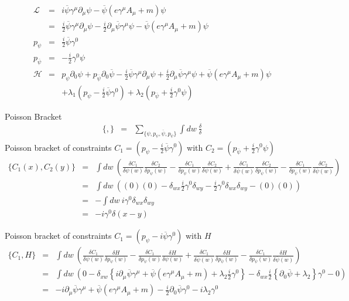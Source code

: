 \documentclass[aps,preprint,preprintnumbers,nofootinbib,showpacs,prd]{revtex4-1}
\newcommand{\nbea}{\begin{eqnarray*}}
\newcommand{\neea}{\end{eqnarray*}}
\begin{document}
%
\nbea
\mathcal{L} & = & i \overline \psi \gamma^\mu \partial_\mu \psi - \overline \psi \left ( e \gamma^\mu A_\mu + m\right ) \psi \\
& = & \frac{i}{2} \overline \psi \gamma^\mu \partial_\mu \psi  - \frac{i}{2} \partial_\mu \overline \psi \gamma^\mu \psi - \overline \psi \left ( e \gamma^\mu A_\mu + m\right ) \psi \\
p_\psi & = & \frac{i}{2} \overline \psi \gamma^0 \\
p_{\overline \psi} & = & -\frac{i}{2} \gamma^0 \psi \\
\mathcal{H} & = & p_\psi \partial_0\psi + p_{\overline \psi} \partial_0\overline\psi - \frac{i}{2} \overline \psi \gamma^\mu \partial_\mu \psi + \frac{i}{2} \partial_\mu \overline \psi \gamma^\mu \psi + \overline \psi \left ( e \gamma^\mu A_\mu + m\right ) \psi \\
&& + \lambda_1 (p_\psi - \frac{i}{2} \overline \psi \gamma^0) + \lambda_2(p_{\overline \psi} + \frac{i}{2} \gamma^0 \psi)
\neea
%

Poisson Bracket
%
\nbea
\{,\} & = & \sum_{\{\psi, p_\psi, \overline \psi, p_{\overline\psi}\}} \int dw~ \frac{\delta}{\delta}
\neea
%
Poisson bracket of constraints $C_1 = (p_\psi - \frac{i}{2} \overline \psi \gamma^0) $ with $C_2 = (p_{\overline \psi} + \frac{i}{2} \gamma^0 \psi)$ 
%
\nbea
\{C_1(x), C_2(y) \} & = & \int dw~ \left ( \frac{\delta C_1}{\delta \psi(w)} \frac{\delta C_2}{\delta p_\psi(w)} - \frac{\delta C_1}{\delta p_\psi(w)} \frac{\delta C_2}{\delta \psi(w)}  + \frac{\delta C_1}{\delta \overline \psi(w)} \frac{\delta C_2}{\delta p_{\overline \psi}(w)} - \frac{\delta C_1}{\delta p_{\overline\psi}(w)} \frac{\delta C_2}{\delta \overline \psi(w)} \right ) \\
& = & \int dw~ \left ( (0) (0) - \delta_{wx} \frac{i}{2} \gamma^0 \delta_{wy}  - \frac{i}{2} \gamma^0 \delta_{wx}\delta_{wy} - (0)(0) \right ) \\
& = &  -\int dw~ i \gamma^0 \delta_{wx}\delta_{wy} \\
& = & - i \gamma^0 \delta(x - y)
\neea
%

Poisson bracket of constraints $C_1 = (p_\psi - i \overline \psi \gamma^0)$ with $H$
%
\nbea
\{C_1, H \} & = & \int dw~ \left ( \frac{\delta C_1}{\delta \psi(w)} \frac{\delta H}{\delta p_\psi(w)} - \frac{\delta C_1}{\delta p_\psi(w)} \frac{\delta H}{\delta \psi(w)}  + \frac{\delta C_1}{\delta \overline \psi(w)} \frac{\delta H}{\delta p_{\overline \psi}(w)} - \frac{\delta C_1}{\delta p_{\overline\psi}(w)} \frac{\delta H}{\delta \overline \psi(w)} \right ) \\
& = & \int dw~ \left ( 0 - \delta_{xw} \left \{ i \partial_\mu \overline \psi \gamma^\mu + \overline \psi \left ( e \gamma^\mu A_\mu + m\right ) + \lambda_2 \frac{i}{2}\gamma^0 \right \} - \delta_{wx} \frac{i}{2} \left \{ \partial_0 \overline\psi + \lambda_2 \right \}\gamma^0 - 0 \right ) \\
& = & - i \partial_\mu \overline \psi \gamma^\mu + \overline \psi \left ( e \gamma^\mu A_\mu + m\right ) - \frac{i}{2} \partial_0 \overline\psi \gamma^0 - i \lambda_2 \gamma^0
\neea
%
\end{document}
